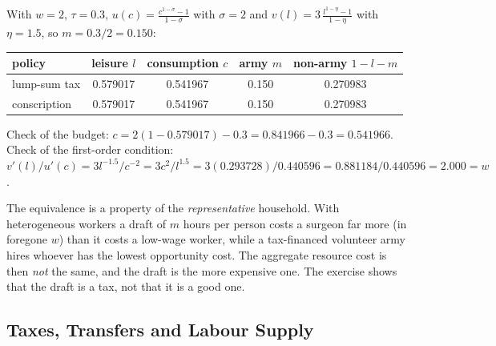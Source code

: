 \documentclass[12pt, letterpaper]{article}
\begin{document}
\begin{tcolorbox}[evenbox,title={Problem 7.2 \quad Military Service}]
\begin{tcolorbox}[databox]
With $w=2$, $\tau=0.3$, $u(c)=\frac{c^{1-\sigma}-1}{1-\sigma}$ with $\sigma=2$ and
$v(l)=3\,\frac{l^{1-\eta}-1}{1-\eta}$ with $\eta=1.5$, so $m=0.3/2=0.150$:

\begin{center}
\begin{tabular}{@{}lcccc@{}}
\toprule
policy & leisure $l$ & consumption $c$ & army $m$ & non-army $1-l-m$\\
\midrule
lump-sum tax & 0.579017 & 0.541967 & 0.150 & 0.270983\\
conscription & 0.579017 & 0.541967 & 0.150 & 0.270983\\
\bottomrule
\end{tabular}
\end{center}
Check of the budget: $c=2(1-0.579017)-0.3=0.841966-0.3=0.541966$. Check of the first-order
condition: $v'(l)/u'(c)=3l^{-1.5}/c^{-2}=3c^{2}/l^{1.5}=3(0.293728)/0.440596=0.881184/0.440596
=2.000=w$. \checkmark
\end{tcolorbox}

\begin{tcolorbox}[trapbox]
The equivalence is a property of the \emph{representative} household. With heterogeneous
workers a draft of $m$ hours per person costs a surgeon far more (in foregone $w$) than it
costs a low-wage worker, while a tax-financed volunteer army hires whoever has the lowest
opportunity cost. The aggregate resource cost is then \emph{not} the same, and the draft is
the more expensive one. The exercise shows that the draft is a tax, not that it is a good one.
\end{tcolorbox}
\end{tcolorbox}

\newpage
\subsection{Taxes, Transfers and Labour Supply}
\end{document}
